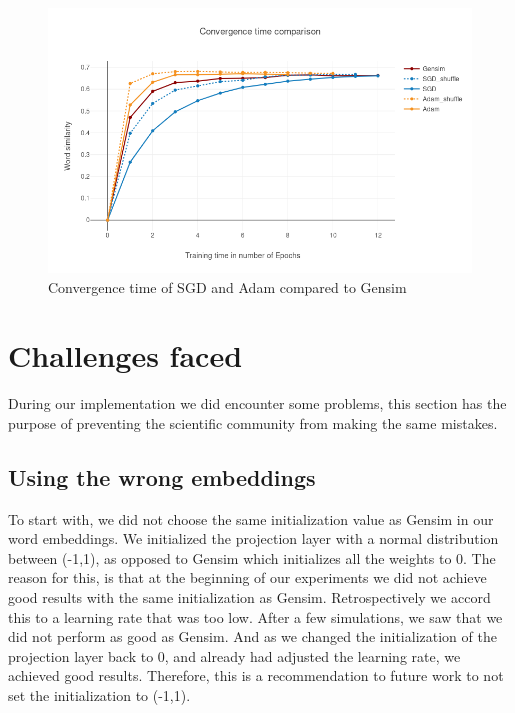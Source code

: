 \begin{figure}[H]
\centering
\includegraphics[scale=0.45]{images/gensim_vs_adam}
\caption{Convergence time of SGD and Adam compared to Gensim}
\label{fig:gensim_vs_adam}
\end{figure}\section{Challenges faced}
During our implementation we did encounter some problems, this section has the purpose of preventing the scientific community from making the same mistakes.
\subsection{Using the wrong embeddings}
To start with, we did not choose the same initialization value as Gensim in our word embeddings. We initialized the projection layer with a normal distribution between (-1,1), as opposed to Gensim which initializes all the weights to 0. The reason for this, is that at the beginning of our experiments we did not achieve good results with the same initialization as Gensim. Retrospectively we accord this to a learning rate that was too low. After a few simulations, we saw that we did not perform as good as Gensim. And as we changed the initialization of the projection layer back to 0, and already had adjusted the learning rate, we achieved good results. Therefore, this is a recommendation to future work to not set the initialization to (-1,1).

